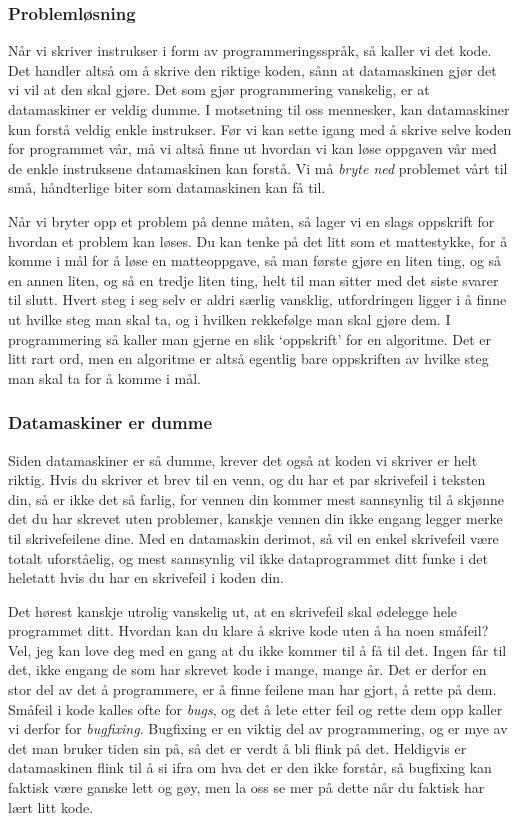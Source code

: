 \documentclass[a4paper, 11pt, notitlepage]{article}
\begin{document}
\subsubsection*{Problemløsning}

Når vi skriver instrukser i form av programmeringsspråk, så kaller vi det kode. Det handler altså om å skrive den riktige koden, sånn at datamaskinen gjør det vi vil at den skal gjøre. Det som gjør programmering vanskelig, er at datamaskiner er veldig dumme. I motsetning til oss mennesker, kan datamaskiner kun forstå veldig enkle instrukser. Før vi kan sette igang med å skrive selve koden for programmet vår, må vi altså finne ut hvordan vi kan løse oppgaven vår med de enkle instruksene datamaskinen kan forstå. Vi må \emph{bryte ned} problemet vårt til små, håndterlige biter som datamaskinen kan få til.

Når vi bryter opp et problem på denne måten, så lager vi en slags oppskrift for hvordan et problem kan løses. Du kan tenke på det litt som et mattestykke, for å komme i mål for å løse en matteoppgave, så man første gjøre en liten ting, og så en annen liten, og så en tredje liten ting, helt til man sitter med det siste svarer til slutt. Hvert steg i seg selv er aldri særlig vansklig, utfordringen ligger i å finne ut hvilke steg man skal ta, og i hvilken rekkefølge man skal gjøre dem. I programmering så kaller man gjerne en slik `oppskrift' for en algoritme. Det er litt rart ord, men en algoritme er altså egentlig bare oppskriften av hvilke steg man skal ta for å komme i mål.

\subsubsection*{Datamaskiner er dumme}

Siden datamaskiner er så dumme, krever det også at koden vi skriver er helt riktig. Hvis du skriver et brev til en venn, og du har et par skrivefeil i teksten din, så er ikke det så farlig, for vennen din kommer mest sannsynlig til å skjønne det du har skrevet uten problemer, kanskje vennen din ikke engang legger merke til skrivefeilene dine. Med en datamaskin derimot, så vil en enkel skrivefeil være totalt uforståelig, og mest sannsynlig vil ikke dataprogrammet ditt funke i det heletatt hvis du har en skrivefeil i koden din. 

Det hørest kanskje utrolig vanskelig ut, at en skrivefeil skal ødelegge hele programmet ditt. Hvordan kan du klare å skrive kode uten å ha noen småfeil? Vel, jeg kan love deg med en gang at du ikke kommer til å få til det. Ingen får til det, ikke engang de som har skrevet kode i mange, mange år. Det er derfor en stor del av det å programmere, er å finne feilene man har gjort, å rette på dem. Småfeil i kode kalles ofte for \emph{bugs}, og det å lete etter feil og rette dem opp kaller vi derfor for \emph{bugfixing}. Bugfixing er en viktig del av programmering, og er mye av det man bruker tiden sin på, så det er verdt å bli flink på det. Heldigvis er datamaskinen flink til å si ifra om hva det er den ikke forstår, så bugfixing kan faktisk være ganske lett og gøy, men la oss se mer på dette når du faktisk har lært litt kode.
\end{document}
